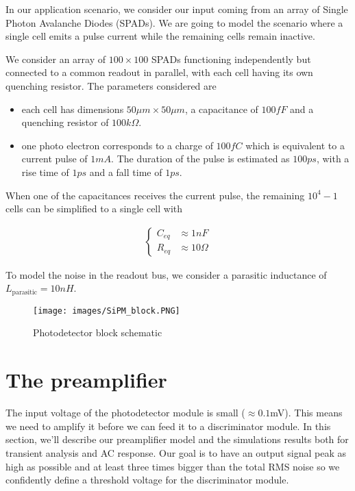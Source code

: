 \documentclass[a4paper,12pt,twoside]{article}
\begin{document}
	In our application scenario, we consider our input coming from an array of Single Photon Avalanche Diodes (SPADs). We are going to model the scenario where a single cell emits a pulse current while the remaining cells remain inactive.
	
	We consider an array of $100\times100$ SPADs functioning independently but connected to a common readout in parallel, with each cell having its own quenching resistor. The parameters considered are
	
	\begin{itemize}
		\item each cell has dimensions $50\mu m \times 50\mu m$, a capacitance of $100fF$ and a quenching resistor of $100k\Omega$.
		\item one photo electron corresponds to a charge of $100fC$ which is equivalent to a current pulse of $1mA$. The duration of the pulse is estimated as $100ps$, with a rise time of $1ps$ and a fall time of $1ps$.
	\end{itemize}
	
	When one of the capacitances receives the current pulse, the remaining $10^4 - 1$ cells can be simplified to a single cell with
	
	\begin{align}
		\begin{cases}
			C_{eq} &\approx 1nF \\
			R_{eq} &\approx 10\Omega
		\end{cases}
	\end{align}
	
	To model the noise in the readout bus, we consider a parasitic inductance of $L_{\text{parasitic}} = 10nH$.
	
	\begin{figure}[h]
		\centering
		\texttt{[image: images/SiPM\_block.PNG]}
		\caption{Photodetector block schematic}
	\end{figure}
	
	\newpage
	
	\section{The preamplifier}
	
	The input voltage of the photodetector module is small ($\approx 0.1$mV). This means we need to amplify it before we can feed it to a discriminator module. In this section, we'll describe our preamplifier model and the simulations results both for transient analysis and AC response. Our goal is to have an output signal peak as high as possible and at least three times bigger than the total RMS noise so we confidently define a threshold voltage for the discriminator module.
	
\end{document}
